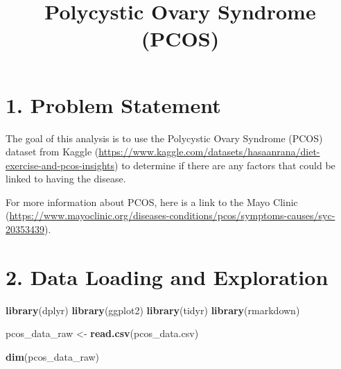 \documentclass[
]{article}
\title{Polycystic Ovary Syndrome (PCOS)}
\author{}
\date{\vspace{-2.5em}}
\newenvironment{Shaded}{\begin{snugshade}}{\end{snugshade}}
\newcommand{\FunctionTok}[1]{\textcolor[rgb]{0.13,0.29,0.53}{\textbf{#1}}}
\newcommand{\NormalTok}[1]{#1}
\newcommand{\OtherTok}[1]{\textcolor[rgb]{0.56,0.35,0.01}{#1}}
\newcommand{\StringTok}[1]{\textcolor[rgb]{0.31,0.60,0.02}{#1}}
\begin{document}
\maketitle

\section{1. Problem Statement}\label{problem-statement}

The goal of this analysis is to use the Polycystic Ovary Syndrome (PCOS)
dataset from Kaggle
(\url{https://www.kaggle.com/datasets/hasaanrana/diet-exercise-and-pcos-insights})
to determine if there are any factors that could be linked to having the
disease.

For more information about PCOS, here is a link to the Mayo Clinic
(\url{https://www.mayoclinic.org/diseases-conditions/pcos/symptoms-causes/syc-20353439}).

\section{2. Data Loading and
Exploration}\label{data-loading-and-exploration}

\begin{Shaded}
\begin{Highlighting}[]
\FunctionTok{library}\NormalTok{(}\StringTok{\textquotesingle{}dplyr\textquotesingle{}}\NormalTok{)}
\FunctionTok{library}\NormalTok{(}\StringTok{\textquotesingle{}ggplot2\textquotesingle{}}\NormalTok{)}
\FunctionTok{library}\NormalTok{(}\StringTok{\textquotesingle{}tidyr\textquotesingle{}}\NormalTok{)}
\FunctionTok{library}\NormalTok{(}\StringTok{\textquotesingle{}rmarkdown\textquotesingle{}}\NormalTok{)}
\end{Highlighting}
\end{Shaded}

\begin{Shaded}
\begin{Highlighting}[]
\NormalTok{pcos\_data\_raw }\OtherTok{\textless{}{-}} \FunctionTok{read.csv}\NormalTok{(}\StringTok{\textquotesingle{}pcos\_data.csv\textquotesingle{}}\NormalTok{)}
\end{Highlighting}
\end{Shaded}

\begin{Shaded}
\begin{Highlighting}[]
\FunctionTok{dim}\NormalTok{(pcos\_data\_raw)}
\end{Highlighting}
\end{Shaded}
\end{document}
